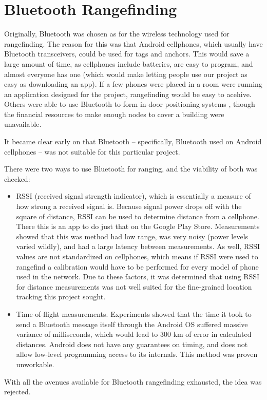 
\chapter{Bluetooth Rangefinding} %

\label{BluetoothFailure} %

Originally, Bluetooth was chosen as for the wireless technology used for rangefinding. The reason for this was that Android cellphones, which usually have Bluetooth transceivers, could be used for tags and anchors. This would save a large amount of time, as cellphones include batteries, are easy to program, and almost everyone has one (which would make letting people use our project as easy as downloading an app). If a few phones were placed in a room were running an application designed for the project, rangefinding would be easy to acehive. Others were able to use Bluetooth to form in-door positioning systems \cite{BluetoothIndoor}, though the financial resources to make enough nodes to cover a building were unavailable.

It became clear early on that Bluetooth -- specifically, Bluetooth used on Android cellphones -- was not suitable for this particular project. 

There were two ways to use Bluetooth for ranging, and the viability of both was checked: 

\begin{itemize}
	\item RSSI (received signal strength indicator), which is essentially a measure of how strong a received signal is. Because signal power drops off with the square of distance, RSSI can be used to determine distance from a cellphone. There this is an app to do just that on the Google Play Store. Measurements showed that this was method had low range, was very noisy (power levels varied wildly), and had a large latency between measurements. As well, RSSI values are not standardized on cellphones, which means if RSSI were used to rangefind a calibration would have to be performed for every model of phone used in the network. Due to these factors, it was determined that using RSSI for distance measurements was not well suited for the fine-grained location tracking this project sought. 
	\item Time-of-flight measurements. Experiments showed that the time it took to send a Bluetooth message itself through the Android OS suffered massive variance of milliseconds, which would lead to 300 km of error in calculated distances. Android does not have any guarantees on timing, and does not allow low-level programming access to its internals. This method was proven unworkable.
\end{itemize}

With all the avenues available for Bluetooth rangefinding exhausted, the idea was rejected.